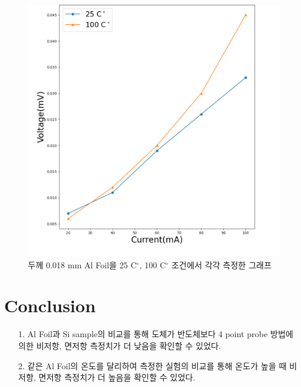 \documentclass[aps,reprint,superscriptaddress,10pt]{revtex4-2}
\begin{document}
  \begin{figure}[htbp]
    \vspace{0.5cm}
    \centering
    \includegraphics[scale = 0.25]{AlAl2.png}
    \caption{두께 0.018 mm Al Foil을 25 C$^\circ$, 100 C$^\circ$ 조건에서
    각각 측정한 그래프}
    \label{AlAl2}
  \end{figure}



\section{Conclusion}
\begin{itemize}
  \item[1. ]
  Al Foil과 Si sample의 비교를 통해 도체가 반도체보다 4 point probe 방법에 의한
  비저항, 면저항 측정치가 더 낮음을 확인할 수 있었다.
  \item[2. ]
  같은 Al Foil의 온도를 달리하여 측정한 실험의 비교를 통해 온도가 높을 때
  비저항, 면저항 측정치가 더 높음을 확인할 수 있었다.
\end{itemize}


% 




\vfill
\end{document}
